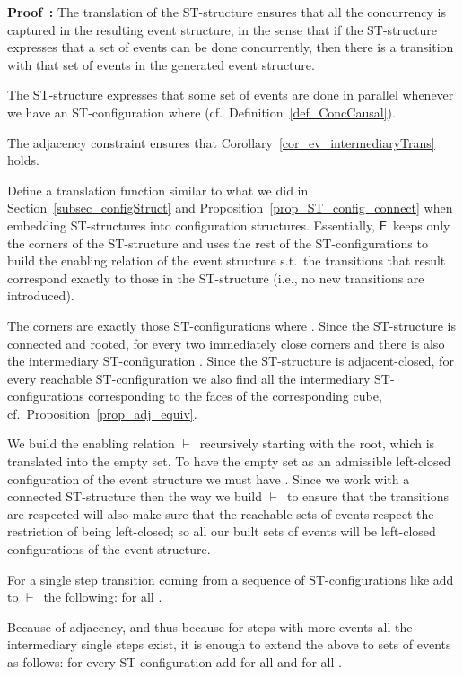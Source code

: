 \documentclass[submission,copyright,creativecommons]{eptcs}
\newenvironment{proof}[1][\!\!\,]{\vspace{1ex}\noindent\textbf{Proof #1: }}{\hfill\vspace{2ex}}
\newcommand\enableRelEv{\ensuremath{\vdash}}
\newcommand\stintoe{\ensuremath{\mathsf{E}}}
\begin{document}
\begin{proof}
The translation of the ST-structure ensures that all the concurrency is captured in the resulting event structure, in the sense that if the ST-structure expresses that a set of events can be done concurrently, then there is a transition with that set of events in the generated event structure.

The ST-structure expresses that some set of events  are done in parallel whenever we have an ST-configuration where  (cf.\ Definition~\ref{def_ConcCausal}).

The adjacency constraint ensures that Corollary~\ref{cor_ev_intermediaryTrans} holds.

Define a translation function  similar to what we did in Section~\ref{subsec_configStruct} and Proposition~\ref{prop_ST_config_connect} when embedding ST-structures into configuration structures. Essentially, \stintoe\ keeps only the corners of the ST-structure and uses the rest of the ST-configurations to build the enabling relation of the event structure s.t.\ the transitions that result correspond exactly to those in the ST-structure (i.e., no new transitions are introduced). 

The corners are exactly those ST-configurations where .
Since the ST-structure is connected and rooted, for every two immediately close corners  and  there is also the intermediary ST-configuration . Since the ST-structure is adjacent-closed, for every reachable ST-configuration  we also find all the intermediary ST-configurations corresponding to the faces of the corresponding cube, cf.~Proposition~\ref{prop_adj_equiv}.

We build the enabling relation \enableRelEv\ recursively starting with the root, which is translated into the empty set. To have the empty set as an admissible left-closed configuration of the event structure we must have . Since we work with a connected ST-structure then the way we build \enableRelEv\ to ensure that the transitions are respected will also make sure that the reachable sets of events respect the restriction of being left-closed; so all our built sets of events will be left-closed configurations of the event structure.

For a single step transition coming from a sequence of ST-configurations like   add to \enableRelEv\ the following:  for all .

Because of adjacency, and thus because for steps with more events all the intermediary single steps exist, it is enough to extend the above to sets of events  as follows: for every ST-configuration  add   for all  and for all .


\end{proof}
\end{document}
